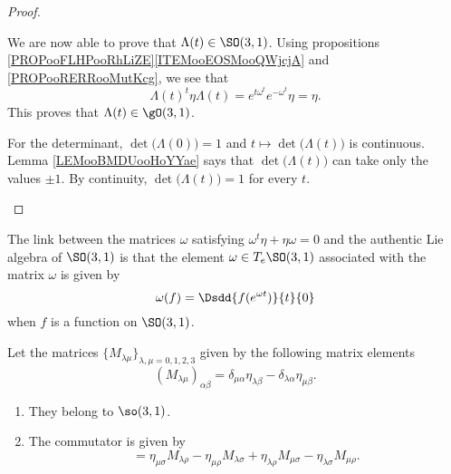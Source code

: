 \begin{proof}
\begin{subproof}
		We are now able to prove that \( \Lambda(t)\in \SO(3,1)\). Using propositions \ref{PROPooFLHPooRhLiZE}\ref{ITEMooEOSMooQWjcjA} and \ref{PROPooRERRooMutKcg}, we see that
		\begin{equation}
			\Lambda(t)^t\eta\Lambda(t)= e^{t\omega^t} e^{-\omega^t}\eta=\eta.
		\end{equation}
		This proves that \( \Lambda(t)\in \gO(3,1)\).

		For the determinant, \( \det\big( \Lambda(0) \big)=1\) and \( t\mapsto \det\big( \Lambda(t) \big)\) is continuous. Lemma \ref{LEMooBMDUooHoYYae} says that \( \det\big( \Lambda(t) \big)\) can take only the values \( \pm1\). By continuity, \( \det\big( \Lambda(t) \big)=1\) for every \( t\).
	\end{subproof}
\end{proof}

\begin{normaltext}
	The link between the matrices \( \omega\) satisfying \( \omega^t\eta+\eta\omega=0\) and the authentic Lie algebra of \( \SO(3,1)\) is that the element \( \omega\in T_e\SO(3,1)\) associated with the matrix \( \omega\) is given by
	\begin{equation}
		\omega(f)=\Dsdd{ f( e^{\omega t}) }{t}{0}
	\end{equation}
	when \( f\) is a function on \( \SO(3,1)\).
\end{normaltext}

\begin{lemma}        \label{LEMooVAYBooHcPKHU}
	Let the matrices \( \{ M_{\lambda\mu} \}_{\lambda,\mu=0,1,2,3}\) given by the following matrix elements
	\begin{equation}
		(M_{\lambda\mu})_{\alpha\beta}=\delta_{\mu\alpha}\eta_{\lambda\beta}-\delta_{\lambda\alpha}\eta_{\mu\beta}.
	\end{equation}
	\begin{enumerate}
		\item
		      They belong to \( \so(3,1)\).
		\item
		      The commutator is given by
		      \begin{equation}
			      [M_{\lambda\mu}, M_{\rho\sigma}]=\eta_{\mu\sigma}M_{\lambda\rho}-\eta_{\mu\rho}M_{\lambda\sigma}+\eta_{\lambda\rho}M_{\mu\sigma}-\eta_{\lambda\sigma}M_{\mu\rho}.
		      \end{equation}
	\end{enumerate}
\end{lemma}

